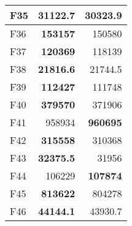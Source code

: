 \begin{table}[]
\begin{tabular}{lrr|}
\multicolumn{1}{|l|}{\cellcolor[HTML]{FCE6AB}F35} & \multicolumn{1}{r|}{\cellcolor[HTML]{D3FFB6}\textbf{31122.7}} & 30323.9                                                   \\ \hline
\multicolumn{1}{|l|}{\cellcolor[HTML]{FCE6AB}F36} & \multicolumn{1}{r|}{\cellcolor[HTML]{D3FFB6}\textbf{153157}}  & 150580                                                    \\ \hline
\multicolumn{1}{|l|}{\cellcolor[HTML]{FCE6AB}F37} & \multicolumn{1}{r|}{\cellcolor[HTML]{D3FFB6}\textbf{120369}}  & 118139                                                    \\ \hline
\multicolumn{1}{|l|}{\cellcolor[HTML]{FCE6AB}F38} & \multicolumn{1}{r|}{\cellcolor[HTML]{D3FFB6}\textbf{21816.6}} & 21744.5                                                   \\ \hline
\multicolumn{1}{|l|}{\cellcolor[HTML]{FCE6AB}F39} & \multicolumn{1}{r|}{\cellcolor[HTML]{D3FFB6}\textbf{112427}}  & 111748                                                    \\ \hline
\multicolumn{1}{|l|}{\cellcolor[HTML]{FCE6AB}F40} & \multicolumn{1}{r|}{\cellcolor[HTML]{D3FFB6}\textbf{379570}}  & 371906                                                    \\ \hline
\multicolumn{1}{|l|}{\cellcolor[HTML]{FCE6AB}F41} & \multicolumn{1}{r|}{958934}                                   & \cellcolor[HTML]{D3FFB6}\textbf{960695}                   \\ \hline
\multicolumn{1}{|l|}{\cellcolor[HTML]{FCE6AB}F42} & \multicolumn{1}{r|}{\cellcolor[HTML]{D3FFB6}\textbf{315558}}  & 310368                                                    \\ \hline
\multicolumn{1}{|l|}{\cellcolor[HTML]{FCE6AB}F43} & \multicolumn{1}{r|}{\cellcolor[HTML]{D3FFB6}\textbf{32375.5}} & 31956                                                     \\ \hline
\multicolumn{1}{|l|}{\cellcolor[HTML]{FCE6AB}F44} & \multicolumn{1}{r|}{106229}                                   & \cellcolor[HTML]{D3FFB6}\textbf{107874}                   \\ \hline
\multicolumn{1}{|l|}{\cellcolor[HTML]{FCE6AB}F45} & \multicolumn{1}{r|}{\cellcolor[HTML]{D3FFB6}\textbf{813622}}  & 804278                                                    \\ \hline
\multicolumn{1}{|l|}{\cellcolor[HTML]{FCE6AB}F46} & \multicolumn{1}{r|}{\cellcolor[HTML]{D3FFB6}\textbf{44144.1}} & 43930.7                                                   \\ \hline

\end{tabular}
\end{table}

